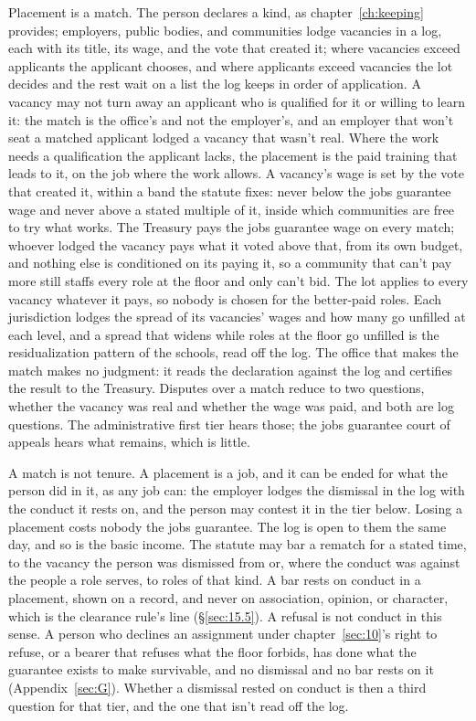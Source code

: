 Placement is a match. The person declares a kind, as chapter~\ref{ch:keeping} provides; employers, public bodies, and communities lodge vacancies in a log, each with its title, its wage, and the vote that created it; where vacancies exceed applicants the applicant chooses, and where applicants exceed vacancies the lot decides and the rest wait on a list the log keeps in order of application. A vacancy may not turn away an applicant who is qualified for it or willing to learn it: the match is the office's and not the employer's, and an employer that won't seat a matched applicant lodged a vacancy that wasn't real. Where the work needs a qualification the applicant lacks, the placement is the paid training that leads to it, on the job where the work allows. A vacancy's wage is set by the vote that created it, within a band the statute fixes: never below the jobs guarantee wage and never above a stated multiple of it, inside which communities are free to try what works. The Treasury pays the jobs guarantee wage on every match; whoever lodged the vacancy pays what it voted above that, from its own budget, and nothing else is conditioned on its paying it, so a community that can't pay more still staffs every role at the floor and only can't bid. The lot applies to every vacancy whatever it pays, so nobody is chosen for the better-paid roles. Each jurisdiction lodges the spread of its vacancies' wages and how many go unfilled at each level, and a spread that widens while roles at the floor go unfilled is the residualization pattern of the schools, read off the log. The office that makes the match makes no judgment: it reads the declaration against the log and certifies the result to the Treasury. Disputes over a match reduce to two questions, whether the vacancy was real and whether the wage was paid, and both are log questions. The administrative first tier hears those; the jobs guarantee court of appeals hears what remains, which is little.

A match is not tenure. A placement is a job, and it can be ended for what the person did in it, as any job can: the employer lodges the dismissal in the log with the conduct it rests on, and the person may contest it in the tier below. Losing a placement costs nobody the jobs guarantee. The log is open to them the same day, and so is the basic income. The statute may bar a rematch for a stated time, to the vacancy the person was dismissed from or, where the conduct was against the people a role serves, to roles of that kind. A bar rests on conduct in a placement, shown on a record, and never on association, opinion, or character, which is the clearance rule's line (\S\ref{sec:15.5}). A refusal is not conduct in this sense. A person who declines an assignment under chapter~\ref{sec:10}'s right to refuse, or a bearer that refuses what the floor forbids, has done what the guarantee exists to make survivable, and no dismissal and no bar rests on it (Appendix~\ref{sec:G}). Whether a dismissal rested on conduct is then a third question for that tier, and the one that isn't read off the log.

